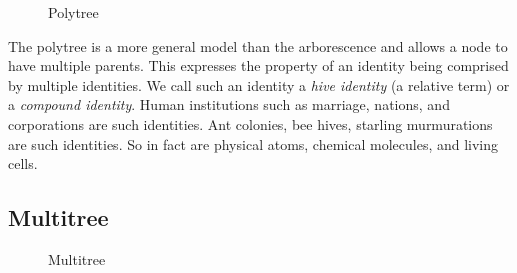 \documentclass[pra,twocolumn,groupedaddress,10pt]{revtex4}
\theoremstyle{definition}
\begin{document}
\begin{figure}[htp]
\centering
{}
\caption{\label{fig:polytree}Polytree}
\end{figure}

The polytree\cite{polytree} is a more general model than the arborescence and allows a node to have multiple parents. This expresses the property of an identity being comprised by multiple identities. We call such an identity a \textit{hive identity} (a relative term) or a \textit{compound identity}. Human institutions such as marriage, nations, and corporations are such identities. Ant colonies, bee hives, starling murmurations are such identities. So in fact are physical atoms, chemical molecules, and living cells. %

\subsection{Multitree} \label{sec:multitree}

\begin{figure}[htp]
\centering
{}
\caption{\label{fig:multitree}Multitree}
\end{figure}
\end{document}
